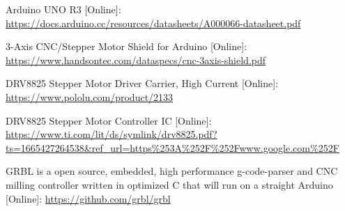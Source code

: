 \documentclass[conference]{IEEEtran}
\begin{document}
\begin{thebibliography}{00}
 Arduino UNO R3 [Online]: \url{https://docs.arduino.cc/resources/datasheets/A000066-datasheet.pdf}

 3-Axis CNC/Stepper Motor Shield for Arduino  [Online]: \url{https://www.handsontec.com/dataspecs/cnc-3axis-shield.pdf}

DRV8825 Stepper Motor Driver Carrier, High Current [Online]: \url{https://www.pololu.com/product/2133}

DRV8825 Stepper Motor Controller IC [Online]: \url{https://www.ti.com/lit/ds/symlink/drv8825.pdf?ts=1665427264538&ref_url=https%253A%252F%252Fwww.google.com%252F}


 GRBL is a open source, embedded, high performance g-code-parser and CNC milling controller written in optimized C that will run on a straight Arduino [Online]:
\url{https://github.com/grbl/grbl}


\end{thebibliography}
\vspace{12pt}
\end{document}
